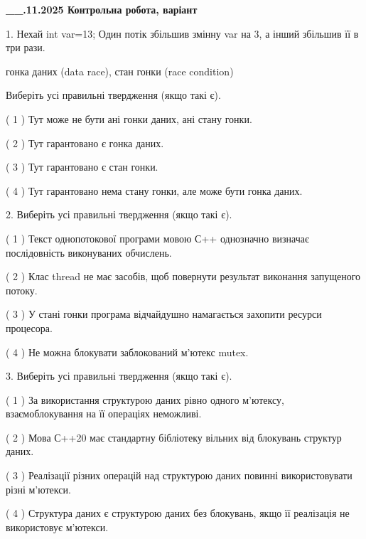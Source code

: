 \documentclass[12pt, ukrainian]{article}
\begin{document}
\newpage
\begin {large}

\textbf{\_\_.11.2025 Контрольна робота, варіант  }\par


{
1. Нехай int var=13; Один потік збільшив змінну var на 3, а інший збільшив її в три рази.

гонка даних (data race), стан гонки (race condition)

Виберіть усі правильні твердження (якщо такі є).\par
\vspace{2mm}
( 1 ) Тут може не бути ані гонки даних, ані стану гонки.%

( 2 ) Тут гарантовано є гонка даних.%

( 3 ) Тут гарантовано є стан гонки.%

( 4 ) Тут гарантовано нема стану гонки, але може бути гонка даних.%


2. Виберіть усі правильні твердження (якщо такі є).\par
\vspace{2mm}

( 1 ) Текст однопотокової програми мовою С++ однозначно визначає послідовність виконуваних обчислень.%

( 2 ) Клас thread не має засобів, щоб повернути результат виконання запущеного потоку.%

( 3 ) У стані гонки програма відчайдушно намагається захопити ресурси процесора.%

( 4 ) Не можна блокувати заблокований м’ютекс mutex.%


3. Виберіть усі правильні твердження (якщо такі є).\par
\vspace{2mm}

( 1 ) За використання структурою даних рівно одного м’ютексу, взаємоблокування на її операціях неможливі.%

( 2 ) Мова С++20 має стандартну бібліотеку вільних від блокувань структур даних.%

( 3 ) Реалізації різних операцій над структурою даних повинні використовувати різні м’ютекси.%

( 4 ) Структура даних є структурою даних без блокувань, якщо її реалізація не використовує м’ютекси.%


}
\end{large}
\end{document}
